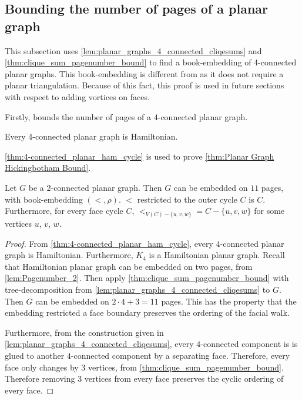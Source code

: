 \subsection{Bounding the number of pages of a planar graph}
This subsection uses \cref{lem:planar_graphs_4_connected_cliqesums} and \cref{thm:clique_sum_pagenumber_bound} to find a book-embedding of 4-connected planar graphs. This book-embedding is different from \textcite{yannakakisEmbeddingPlanarGraphs1989} as it does not require a planar triangulation. Because of this fact, this proof is used in future sections with respect to adding vortices on faces. 

Firstly, \textcite{tutteTheoremPlanarGraphs1956} bounds the number of pages of a $4$-connected planar graph.

\begin{theorem}\label{thm:4-connected_planar_ham_cycle}
	Every 4-connected planar graph is Hamiltonian.
\end{theorem}

\cref{thm:4-connected_planar_ham_cycle} is used to prove \cref{thm:Planar Graph Hickingbotham Bound}.

\begin{corollary}\label{thm:Planar Graph Hickingbotham Bound}
	Let \(G\) be a 2-connected planar graph. Then $G$ can be embedded on $11$ pages, with book-embedding $(<, \rho)$. $<$ restricted to the outer cycle $C$ is $C$. Furthermore, for every face cycle $C$, $<_{V(C) - \{u, v, w\}} = C - \{u, v, w\}$ for some vertices $u$, $v$, $w$. 
\end{corollary}
\begin{proof}
	From \cref{thm:4-connected_planar_ham_cycle}, every $4$-connected planar graph is Hamiltonian. Furthermore, $K_4$ is a Hamiltonian planar graph.
	Recall that Hamiltonian planar graph can be embedded on two pages, from \cref{lem:Pagenumber_2}. 
	Then apply \cref{thm:clique_sum_pagenumber_bound} with tree-decomposition from \cref{lem:planar_graphs_4_connected_cliqesums} to $G$. Then $G$ can be embedded on \(2 \cdot 4 + 3 = 11\) pages. This has the property that the embedding restricted a face boundary preserves the ordering of the facial walk.

	Furthermore, from the construction given in \cref{lem:planar_graphs_4_connected_cliqesums}, every $4$-connected component is is glued to another $4$-connected component by a separating face. Therefore, every face only changes by $3$ vertices, from \cref{thm:clique_sum_pagenumber_bound}. Therefore removing $3$ vertices from every face preserves the cyclic ordering of every face.
\end{proof}

